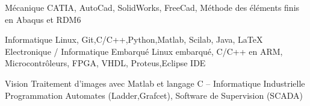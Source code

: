 





\begin{cvskills}
	
\cvskill
{Mécanique} %
{CATIA, AutoCad, SolidWorks, FreeCad, Méthode des éléments finis en Abaqus et RDM6} %

\cvskill
{Informatique} %
{Linux, Git,C/C++,Python,Matlab, Scilab, Java, LaTeX} %
\cvskill
{Electronique / Informatique Embarqué} %
{Linux embarqué, C/C++ en ARM, Microcontrôleurs, FPGA, VHDL, Proteus,Eclipse IDE} %

\cvskill
{Vision} %
{Traitement d'images avec Matlab et langage C} %
--
\cvskill
{Informatique Industrielle} %
{Programmation Automates (Ladder,Grafcet), Software de Supervision (SCADA) } %


\end{cvskills}
